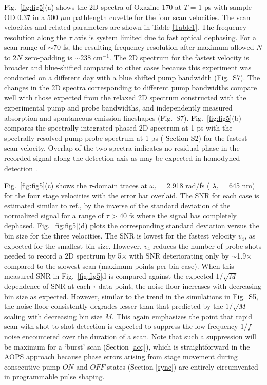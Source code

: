 \documentclass[%
aip,
amsmath,amssymb,
preprint,%
]{revtex4-2}
\newcommand*{\si}[1]{\textcolor{black}{ #1}}
\begin{document}
\si{Fig.~\ref{fig:fig5}(a)} shows the 2D spectra of Oxazine 170 at $T$ = 1 ps with sample OD 0.37 in a 500 $\mu$m pathlength cuvette for the four scan velocities. The scan velocities and related parameters are shown in Table \ref{Table1}. The frequency resolution along the $\tau$ axis is system limited due to fast optical dephasing. For a scan range of $\sim$70 fs, the resulting frequency resolution after maximum allowed $N$ to 2$N$ zero-padding is $\sim$238 cm$^{-1}$. The 2D spectrum for the fastest velocity is broader and blue-shifted compared to other cases because this experiment was conducted on a different day with a blue shifted pump bandwidth (Fig.~S7). The changes in the 2D spectra corresponding to different pump bandwidths compare well with those expected from the relaxed 2D spectrum constructed with the experimental pump and probe bandwidths, and independently measured absorption and spontaneous emission lineshapes\cite{Jonas2001} (Fig.~S7). \si{Fig.~\ref{fig:fig5}(b)} compares the spectrally integrated phased 2D spectrum at 1 ps with the spectrally-resolved pump probe spectrum at 1 ps (\si{Section S2}) for the fastest scan velocity. Overlap of the two spectra indicates no residual phase in the recorded signal along the detection axis as may be expected in homodyned detection \cite{Jonas1999}.

\si{Fig.~\ref{fig:fig5}(c)} shows the $\tau$-domain traces at  $\omega$$_t$ = 2.918 rad/fs (\si{$\lambda_t$ = 645 nm}) for the four stage velocities with the error bar overlaid. The SNR for each case is estimated similar to ref.\cite{Kearns2017}, by the inverse of the standard deviation of the normalized signal for a range of $\tau$ > 40 fs where the signal has completely dephased. \si{Fig.~\ref{fig:fig5}(d)} plots the corresponding standard deviation versus the bin size for the three velocities. The SNR is lowest for the fastest velocity $v_4$, as expected for the smallest bin size. However, $v_4$ reduces the number of probe shots needed to record a 2D spectrum by 5$\times$ with SNR deteriorating only by $\sim$1.9$\times$ compared to the slowest scan (maximum points per bin case). When this measured SNR in Fig.~\ref{fig:fig5}d is compared against the expected $1/\sqrt{M}$ dependence of SNR at each $\tau$ data point, the noise floor increases with decreasing bin size as expected. However, similar to the trend in the simulations in \si{Fig.~S5}, the noise floor consistently degrades lesser than that predicted by the $1/\sqrt{M}$ scaling with decreasing bin size $M$. This again emphasizes the point that rapid scan with shot-to-shot detection is expected to suppress\cite{Kearns2017} the low-frequency 1/$f$ noise encountered\cite{Moon1993} over the duration of a scan. Note that such a suppression will be maximum for a `burst' scan (Section \ref{acq}), which is straightforward in the AOPS approach because phase errors arising from stage movement during consecutive pump $ON$ and $OFF$ states (Section \ref{sync}) are entirely circumvented in programmable pulse shaping.\\
\end{document}
